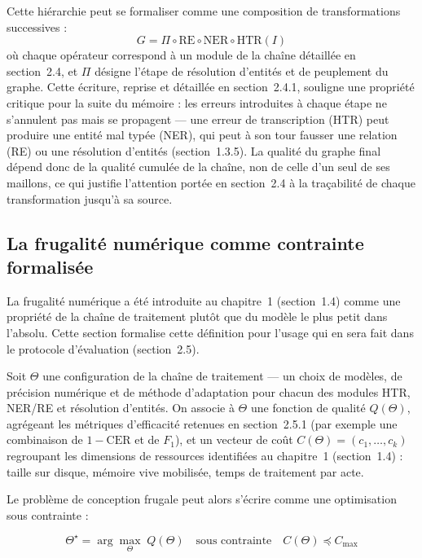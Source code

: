 Cette hiérarchie peut se formaliser comme une composition de transformations
successives :
\begin{equation}
    G = \Pi \circ \mathrm{RE} \circ \mathrm{NER} \circ \mathrm{HTR}(I)
\end{equation}
où chaque opérateur correspond à un module de la chaîne détaillée en section~2.4, et $\Pi$ désigne l'étape de résolution d'entités et de peuplement du graphe.
Cette écriture, reprise et détaillée en section~2.4.1, souligne une propriété critique pour la suite du mémoire : les erreurs introduites à chaque étape ne s'annulent pas mais se propagent --- une erreur de transcription (HTR) peut produire une entité mal typée (NER), qui peut à son tour fausser une relation (RE) ou une résolution d'entités (section~1.3.5).
La qualité du graphe final dépend donc de la qualité cumulée de la chaîne, non de celle d'un seul de ses maillons, ce qui justifie l'attention portée en section~2.4 à la traçabilité de chaque transformation jusqu'à sa source.

\subsection{La frugalité numérique comme contrainte formalisée}

La frugalité numérique a été introduite au chapitre~1 (section~1.4) comme une propriété de la chaîne de traitement plutôt que du modèle le plus petit dans l'absolu. Cette section formalise cette définition pour l'usage qui en sera fait dans le protocole d'évaluation (section~2.5).

Soit $\Theta$ une configuration de la chaîne de traitement --- un choix de modèles, de précision numérique et de méthode d'adaptation pour chacun des modules HTR, NER/RE et résolution d'entités.
On associe à $\Theta$ une fonction de qualité $Q(\Theta)$, agrégeant les métriques d'efficacité retenues en section~2.5.1 (par exemple une combinaison de $1 - \mathrm{CER}$ et de $F_1$), et un vecteur de coût $C(\Theta) = (c_1, \dots, c_k)$ regroupant les dimensions de ressources identifiées au chapitre~1 (section~1.4) : taille sur disque, mémoire vive mobilisée, temps de traitement par acte.

Le problème de conception frugale peut alors s'écrire comme une optimisation
sous contrainte :

\begin{equation}
    \Theta^\star = \arg\max_{\Theta} \; Q(\Theta) \quad \text{sous contrainte} \quad
    C(\Theta) \preceq C_{\max}
\end{equation}

